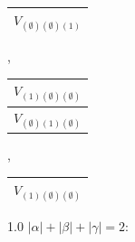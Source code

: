 \documentclass[letterpaper,11pt]{article}
\begin{document}
	\begin{tabular}{| c |}
		\hline
		$V_{(\emptyset)(\emptyset)(1)}$\\
		\hline
	\end{tabular}, 
	\begin{tabular}{| c |}
		\hline
		$V_{(1)(\emptyset)(\emptyset)}$\\
		\hline
		$V_{(\emptyset)(1)(\emptyset)}$\\
		\hline
	\end{tabular}, 
	\begin{tabular}{| c |}
		\hline
		$V_{(1)(\emptyset)(\emptyset)}$\\
		\hline
	\end{tabular}
	\newline	

	\begin{spacing}{1.0}
		$|\alpha| + |\beta| + |\gamma|=2$:
	\end{spacing}
\end{document}
